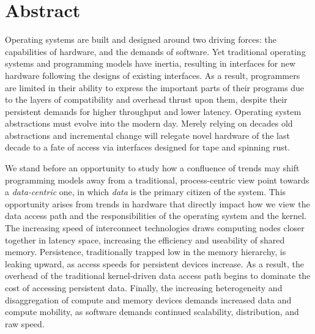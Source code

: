 \begingroup
\let\clearpage\relax
\let\cleardoublepage\relax
\let\cleardoublepage\relax

\chapter*{Abstract}

Operating systems are built and designed around two driving forces: the capabilities of hardware, and the demands of
software. Yet traditional operating systems and programming models have inertia, resulting
in interfaces for new hardware following the designs of existing interfaces. As a result, programmers are limited in their ability to express
the important parts of their programs due to the layers of compatibility and overhead thrust upon them, despite their
persistent demands for higher throughput and lower latency. Operating system abstractions must evolve into the modern day.
Merely relying on decades old abstractions and incremental change will
relegate novel hardware of the last decade to a fate of access via interfaces designed for tape and spinning rust.

We stand before an opportunity to study how a confluence of trends may shift programming models away from a
traditional, process-centric view point towards a \emph{data-centric} one, in which \emph{data} is the primary citizen
of the system.
This opportunity arises from trends in hardware that directly impact how we view the data access path and the
responsibilities of the operating system and the kernel.
The increasing speed of interconnect technologies draws computing nodes closer together in latency space,
increasing the efficiency and useability of shared memory. Persistence, traditionally trapped low in the memory
hierarchy, is leaking upward, as access speeds for persistent devices increase. As a result,
the overhead of the traditional kernel-driven data access path begins to dominate the cost of accessing persistent data.
Finally, the increasing heterogeneity and disaggregation of compute and memory devices demands increased data and
compute mobility, as software demands continued scalability, distribution, and raw speed.

